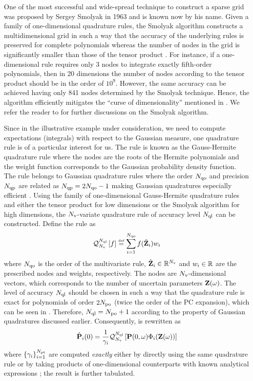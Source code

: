 One of the most successful and wide-spread technique to construct a sparse grid was proposed by Sergey Smolyak in 1963 and is known now by his name. Given a family of one-dimensional quadrature rules, the Smolyak algorithm constructs a multidimensional grid in such a way that the accuracy of the underlying rules is preserved for complete polynomials whereas the number of nodes in the grid is significantly smaller than those of the tensor product \cite{heiss2008, eldred2009}. For instance, if a one-dimensional rule requires only 3 nodes to integrate exactly fifth-order polynomials, then in 20 dimensions the number of nodes according to the tensor product should be in the order of $10^9$. However, the same accuracy can be achieved having only 841 nodes determined by the Smolyak technique. Hence, the algorithm efficiently mitigates the ``curse of dimensionality'' mentioned in . We refer the reader to \cite{eldred2009, maitre2010, heiss2008} for further discussions on the Smolyak algorithm.

Since in the illustrative example under consideration, we need to compute expectations (integrals) with respect to the Gaussian measure, one quadrature rule is of a particular interest for us. The rule is known as the Gauss-Hermite quadrature rule where the nodes are the roots of the Hermite polynomials and the weight function corresponds to the Gaussian probability density function. The rule belongs to Gaussian quadrature rules where the order $N_\text{qo}$ and precision $N_\text{qp}$ are related as $N_\text{qp} = 2 N_\text{qo} - 1$ making Gaussian quadratures especially efficient \cite{heiss2008}. Using the family of one-dimensional Gauss-Hermite quadrature rules and either the tensor product for low dimensions or the Smolyak algorithm for high dimensions, the ${N_\text{v}}$-variate quadrature rule of accuracy level $N_\text{ql}$ can be constructed. Define the rule as
\[
  \mathcal{Q}_{{N_\text{v}}}^{N_\text{ql}}\left[f\right] \stackrel{\text{\tiny def}}{=} \sum_{i = 1}^{N_\text{qo}} f(\hat{\mathbf{Z}}_i) w_i
\]
where $N_\text{qo}$ is the order of the multivariate rule, $\hat{\mathbf{Z}}_i \in \mathbb{R}^{N_\text{v}}$ and $w_i \in \mathbb{R}$ are the prescribed nodes and weights, respectively. The nodes are ${N_\text{v}}$-dimensional vectors, which corresponds to the number of uncertain parameters $\mathbf{Z}(\omega)$. The level of accuracy $N_\text{ql}$ should be chosen in such a way that the quadrature rule is exact for polynomials of order $2 {N_\text{po}}$ (twice the order of the PC expansion), which can be seen in . Therefore, $N_\text{ql} = {N_\text{po}} + 1$ according to the property of Gaussian quadratures discussed earlier. Consequently,  is rewritten as
\[
  \hat{\mathbf{P}}_i(0) = \frac{1}{\gamma_i} \mathcal{Q}_{{N_\text{v}}}^{N_\text{ql}}\left[\mathbf{P}(0, \omega) \Phi_i(\mathbf{Z}(\omega))\right]
\]
where $\{ \gamma_i \}_{i = 1}^{{N_\text{pt}}}$ are computed \emph{exactly} either by directly using the same quadrature rule or by taking products of one-dimensional counterparts with known analytical expressions \cite{xiu2010}; the result is further tabulated.
